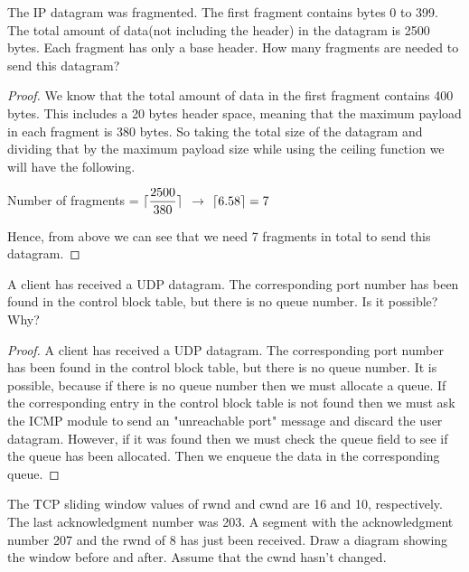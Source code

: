 \documentclass[12pt]{article}
\DeclarePairedDelimiter{\ceil}{\lceil}{\rceil}
\newenvironment{exercise}[2][Exercise]{\begin{trivlist}
\item[\hskip \labelsep {\bfseries #1}\hskip \labelsep {\bfseries #2.}]}{\end{trivlist}}
\begin{document}
\begin{exercise}{12}
The IP datagram was fragmented. The first fragment contains bytes 0 to 399. The total
amount of data(not including the header) in the datagram is 2500 bytes. Each fragment has
only a base header. How many fragments are needed to send this datagram?
\end{exercise}

\begin{proof}
We know that the total amount of data in the first fragment contains 400 bytes. This includes a 20 bytes header space, meaning that the maximum payload in each fragment is 380 bytes. So taking the total size of the datagram and dividing that by the maximum payload size while using the ceiling function we will have the following. 

\begin{center}
    Number of fragments = $\ceil{\dfrac{2500}{380}}$ $\longrightarrow$ $\ceil{6.58} = 7$
\end{center}

Hence, from above we can see that we need 7 fragments in total to send this datagram. 
\end{proof}

\begin{exercise}{13} 
A client has received a UDP datagram. The corresponding port number has been found in
the control block table, but there is no queue number. Is it possible? Why?
\end{exercise}

\begin{proof}
A client has received a UDP datagram.  The corresponding port number has been found in the control block table, but there is no queue number. It is possible, because if there is no queue number then we must allocate a queue. If the corresponding entry in the control block table is not found then we must ask the ICMP module to send an "unreachable port" message and discard the user datagram. However, if it was found then we must check the queue field to see if the queue has been allocated. Then we enqueue the data in the corresponding queue. 
\end{proof}

\begin{exercise}{14}
The TCP sliding window values of rwnd and cwnd are 16 and 10, respectively. The last
acknowledgment number was 203. A segment with the acknowledgment number 207 and
the rwnd of 8 has just been received. Draw a diagram showing the window before and after.
Assume that the cwnd hasn't changed.
\end{exercise}
\end{document}
